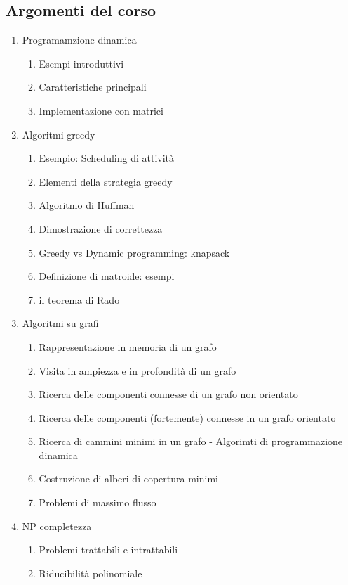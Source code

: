\documentclass[12pt, a4paper, openany]{book}
\begin{document}
\subsection*{Argomenti del corso}
\begin{enumerate}
	\item Programamzione dinamica
	      \begin{enumerate}
		      \item Esempi introduttivi
		      \item Caratteristiche principali
		      \item Implementazione con matrici
	      \end{enumerate}
	\item Algoritmi greedy
	      \begin{enumerate}
		      \item Esempio: Scheduling di attività
		      \item Elementi della strategia greedy
		      \item Algoritmo di Huffman
		      \item Dimostrazione di correttezza
		      \item Greedy vs Dynamic programming: knapsack
		      \item Definizione di matroide: esempi
		      \item il teorema di Rado
	      \end{enumerate}
	\item Algoritmi su grafi
	      \begin{enumerate}
		      \item Rappresentazione in memoria di un grafo
		      \item Visita in ampiezza e in profondità di un grafo
		      \item Ricerca delle componenti connesse di un grafo non orientato
		      \item Ricerca delle componenti (fortemente) connesse in un grafo orientato
		      \item Ricerca di cammini minimi in un grafo - Algorimti di programmazione dinamica
		      \item Costruzione di alberi di copertura minimi
		      \item Problemi di massimo flusso
	      \end{enumerate}
	\item NP completezza
	      \begin{enumerate}
		      \item Problemi trattabili e intrattabili
		      \item Riducibilità polinomiale
	      \end{enumerate}

\end{enumerate}
\end{document}
